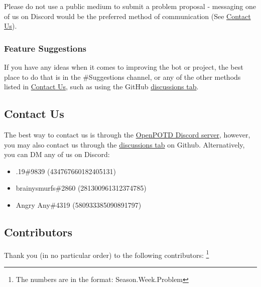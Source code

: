 Please do not use a public medium to submit a problem proposal - messaging one of us on Discord would
 be the preferred method of communication (See \hyperref[sec:contact]{Contact Us}).\medskip

\subsubsection*{Feature Suggestions} 
\label{sec:suggestions}

If you have any ideas when it comes to improving the bot or project, the best place to do that is in the {\selectfont \#Suggestions} channel, or any of the other methods listed in \hyperref[sec:contact]{Contact Us}, such as using the GitHub \href{https://github.com/OpenPOTD/Solutions/discussions}{discussions tab}.\medskip

\subsection*{Contact Us}
\label{sec:contact} 

The best way to contact us is through the \href{https://discord.gg/GsPSSHdhPB}{OpenPOTD Discord server}, 
however, you may also contact us through the \href{https://github.com/OpenPOTD/Solutions/discussions}{discussions tab} on Github.
 Alternatively, you can DM any of us on Discord:

 \begin{itemize}
     \item .19\#9839 (434767660182405131)
     \item brainysmurfs\#2860 (281300961312374785)
     \item Angry Any\#4319 (580933385090891797)
 \end{itemize}
 \medskip

\subsection*{Contributors}
\label{sec:contributors}

Thank you (in no particular order) to the following contributors:
\footnote{The numbers are in the format: Season.Week.Problem}\medskip

